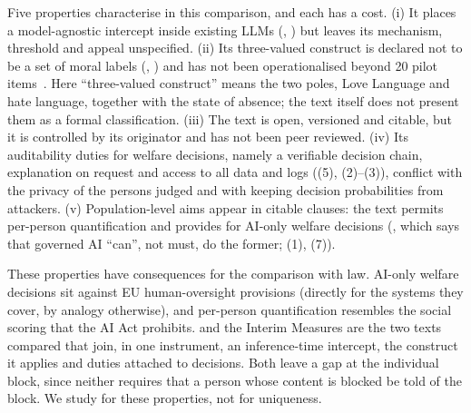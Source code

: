 Five properties characterise \pol{} in this comparison, and each has a cost.
(i) It places a model-agnostic intercept inside existing LLMs (, ) but leaves its mechanism, threshold and appeal unspecified.
(ii) Its three-valued construct is declared not to be a set of moral labels (, ) and has not been operationalised beyond 20 pilot items~\cite{polgov}.
Here ``three-valued construct'' means the two poles, Love Language and hate language, together with the state of absence; the text itself does not present them as a formal classification.
(iii) The text is open, versioned and citable, but it is controlled by its originator and has not been peer reviewed.
(iv) Its auditability duties for welfare decisions, namely a verifiable decision chain, explanation on request and access to all data and logs ((5), (2)--(3)), conflict with the privacy of the persons judged and with keeping decision probabilities from attackers.
(v) Population-level aims appear in citable clauses: the text permits per-person quantification and provides for AI-only welfare decisions (, which says that governed AI ``can'', not must, do the former; (1), (7)).

These properties have consequences for the comparison with law.
AI-only welfare decisions sit against EU human-oversight provisions (directly for the systems they cover, by analogy otherwise), and per-person quantification resembles the social scoring that the AI Act prohibits.
\pol{} and the Interim Measures are the two texts compared that join, in one instrument, an inference-time intercept, the construct it applies and duties attached to decisions.
Both leave a gap at the individual block, since neither requires that a person whose content is blocked be told of the block.
We study \pol{} for these properties, not for uniqueness.
